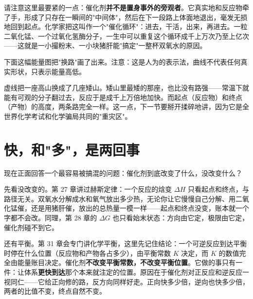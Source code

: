 请注意这里最要紧的一点：催化剂\textbf{并不是置身事外的旁观者}。它真实地和反应物牵了手，形成了只存在一瞬间的"中间体"，然后在下一段路上体面地退出，毫发无损地回到起点。化学家把这叫作一个"催化循环"：进去，干活，出来，再进去。一粒二氧化锰、一个过氧化氢酶分子，一生中可以重复这个循环成千上万次乃至上亿次——这就是一小撮粉末、一小块猪肝能"搞定"一整杯双氧水的原因。

下面这幅能量图把"换路"画了出来。注意：这是人为的表示法，曲线不代表任何真实形状，只表示能量高低。

\begin{center}
\end{center}

虚线把一座高山换成了几座矮山。矮山里最矮的那座，也比没有路强——常温下就能有可观的分子翻过去，反应于是成千上万倍地加快。而起点（反应物）和终点（产物）的高度，两条路完全一样。这一点，下一节要掰开揉碎地讲，因为它是全世界化学考试和化学骗局共同的"重灾区"。

\section{快，和"多"，是两回事}

现在正面回答一个最容易被搞混的问题：催化剂到底改变了什么，没改变什么？

先看没改变的。第 27 章讲过赫斯定律：一个反应的焓变 $\Delta H$ 只看起点和终点，与路径无关。双氧水分解成水和氧气放出多少热，无论你让它慢慢自己分解、用二氧化锰催，还是用猪肝催，放出的总热量一模一样——起点和终点没变，账本就一个字都不会改。同理，第 28 章的 $\Delta G$ 也只看始末状态：方向由它定，极限由它定，催化剂碰不到它。

还有平衡。第 31 章会专门讲化学平衡，这里先记住结论：一个可逆反应到达平衡时停在什么位置（反应物和产物各占多少），由平衡常数 $K$ 决定，而 $K$ 的数值完全由能量账目决定。催化剂\textbf{不改变平衡常数，不改变平衡位置}。它做的事只有一件：让体系\textbf{更快到达}那个本来就注定的位置。原因在于催化剂对正反应和逆反应一视同仁——它给正向修的路，反方向同样好走。正向快多少倍，逆向也快多少倍，两者的比值不变，终点自然不变。

